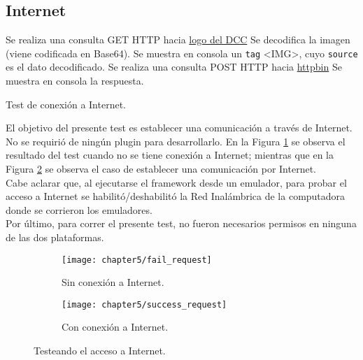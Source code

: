 \subsection{Internet}
\begin{algorithm}
	\begin{algorithmic}[1]
		\STATE Se realiza una consulta GET HTTP hacia \href{https://dcc.fceia.unr.edu.ar/sites/all/themes/birthofcool/images/logo-lcc.png}{logo del DCC}
		\STATE Se decodifica la imagen (viene codificada en Base64).
		\STATE Se muestra en consola un \texttt{tag} \textless IMG\textgreater, cuyo \texttt{source} es el dato decodificado.
		\STATE Se realiza una consulta POST HTTP hacia \href{http://httpbin.org/post}{httpbin}
		\STATE Se muestra en consola la respuesta.
	\end{algorithmic}
	\caption{Test de conexión a Internet.}\label{alg:chap5_test_internet}
\end{algorithm}
El objetivo del presente test es establecer una comunicación a través de Internet. No se requirió de ningún plugin para desarrollarlo. En la Figura \ref{fig:ch05:fail_request} se observa el resultado del test cuando no se tiene conexión a Internet; mientras que en la Figura \ref{fig:ch05:success_request} se observa el caso de establecer una comunicación por Internet.\\
Cabe aclarar que, al ejecutarse el framework desde un emulador, para probar el acceso a Internet se habilitó/deshabilitó la Red Inalámbrica de la computadora donde se corrieron los emuladores.\\
Por último, para correr el presente test, no fueron necesarios permisos en ninguna de las dos plataformas.
\begin{figure}[hbtp]
    \centering
    \begin{subfigure}{.35\linewidth}
		\texttt{[image: chapter5/fail\_request]}
		\caption{Sin conexión a Internet.}
		\label{fig:ch05:fail_request}
	\end{subfigure}
	\begin{subfigure}{.35\linewidth}
		\texttt{[image: chapter5/success\_request]}
		\caption{Con conexión a Internet.}
		\label{fig:ch05:success_request}
	\end{subfigure}
	\caption{Testeando el acceso a Internet.}
	\label{fig:ch05:internet_test}
\end{figure}
